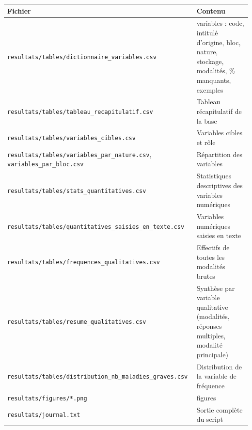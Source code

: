\documentclass[

  french,

  10pt,

  a4paper,

]{article}
\newcounter{none} %
\begin{document}
{\def\LTcaptype{none} %

\begin{longtable}[]{@{}

  >{\raggedright\arraybackslash}p{}

  >{\raggedright\arraybackslash}p{}@{}}

\toprule\noalign{}

\begin{minipage}[b]{\linewidth}\raggedright

Fichier

\end{minipage} & \begin{minipage}[b]{\linewidth}\raggedright

Contenu

\end{minipage} \\

\midrule\noalign{}

\endhead

\bottomrule\noalign{}

\endlastfoot

\texttt{resultats/tables/dictionnaire\_variables.csv} & 73 variables : code, intitulé d'origine, bloc, nature, stockage, modalités, \% manquants, exemples \\

\texttt{resultats/tables/tableau\_recapitulatif.csv} & Tableau récapitulatif de la base \\

\texttt{resultats/tables/variables\_cibles.csv} & Variables cibles et rôle \\

\texttt{resultats/tables/variables\_par\_nature.csv}, \texttt{variables\_par\_bloc.csv} & Répartition des variables \\

\texttt{resultats/tables/stats\_quantitatives.csv} & Statistiques descriptives des variables numériques \\

\texttt{resultats/tables/quantitatives\_saisies\_en\_texte.csv} & Variables numériques saisies en texte \\

\texttt{resultats/tables/frequences\_qualitatives.csv} & Effectifs de toutes les modalités brutes \\

\texttt{resultats/tables/resume\_qualitatives.csv} & Synthèse par variable qualitative (modalités, réponses multiples, modalité principale) \\

\texttt{resultats/tables/distribution\_nb\_maladies\_graves.csv} & Distribution de la variable de fréquence \\

\texttt{resultats/figures/*.png} & 5 figures \\

\texttt{resultats/journal.txt} & Sortie complète du script \\

\end{longtable}

}
\end{document}
